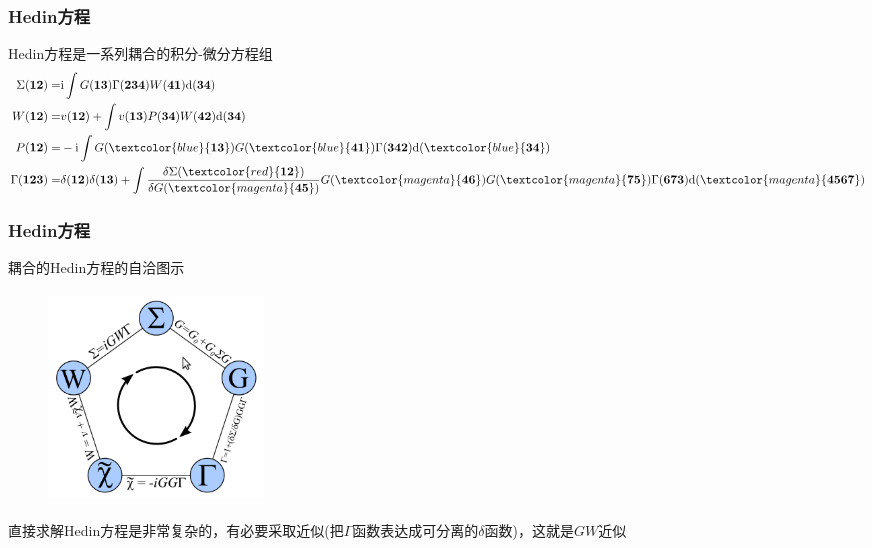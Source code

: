 {\frame
{
	\frametitle{\textrm{Hedin}方程} 
	\textrm{Hedin}方程是一系列耦合的积分-微分方程组%
	\begin{displaymath}
		\begin{aligned}
			\Sigma(\mathbf{12})=&\mathrm{i}\int G(\mathbf{13})\Gamma(\mathbf{234})W(\mathbf{41})\mathrm{d}(\mathbf{34})\\
			W(\mathbf{12})=&v(\mathbf{12})+\int v(\mathbf{13})P(\mathbf{34})W(\mathbf{42})\mathrm{d}(\mathbf{34})\\
			P(\mathbf{12})=&-\mathrm{i}\int G(\textcolor{blue}{\mathbf{13}})G(\textcolor{blue}{\mathbf{41}})\Gamma(\mathbf{342})\mathrm{d}(\textcolor{blue}{\mathbf{34}})\\
			\Gamma(\mathbf{123})=&\delta(\mathbf{12})\delta(\mathbf{13})+\int \frac{\delta\Sigma(\textcolor{red}{\mathbf{12}})}{\delta G(\textcolor{magenta}{\mathbf{45}})}G(\textcolor{magenta}{\mathbf{46}})G(\textcolor{magenta}{\mathbf{75}})\Gamma(\mathbf{673})\mathrm{d}(\textcolor{magenta}{\mathbf{4567}})
		\end{aligned}
	\end{displaymath}
	{\fontsize{7.2pt}{6.2pt}}
{\fontsize{9.0pt}{6.2pt}}
}

\frame
{
	\frametitle{\textrm{Hedin}方程} 
	耦合的\textrm{Hedin}方程的自洽图示
\begin{figure}[h!]
\centering
\vspace{-10pt}
\includegraphics[height=2.2in,width=2.25in,viewport=5 5 330 335,clip]{Figures/GW-1.png}
\label{GW-1}
\end{figure}
	直接求解\textrm{Hedin}方程是非常复杂的，有必要采取近似(把$\Gamma$函数表达成可分离的$\delta$函数)，这就是$GW$近似
}

}
